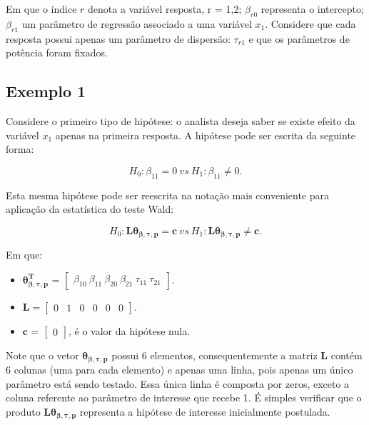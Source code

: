 \noindent Em que o índice $r$ denota a variável resposta, r = 1,2; $\beta_{r0}$ representa o intercepto; $\beta_{r1}$ um parâmetro de regressão associado a uma variável $x_1$. Considere que cada resposta possui apenas um parâmetro de dispersão: $\tau_{r1}$ e que os parâmetros de potência foram fixados.

\subsection{Exemplo 1}

Considere o primeiro tipo de hipótese: o analista deseja saber se existe efeito da variável $x_1$ apenas na primeira resposta. A hipótese pode ser escrita da seguinte forma:

\begin{equation}
H_0: \beta_{11} = 0 \ vs \ H_1: \beta_{11} \neq 0.
\end{equation}

Esta mesma hipótese pode ser reescrita na notação mais conveniente para aplicação da estatística do teste Wald:

\begin{equation}
H_0: \boldsymbol{L}\boldsymbol{\theta_{\beta,\tau,p}} = \boldsymbol{c} \ vs \ H_1: \boldsymbol{L}\boldsymbol{\theta_{\beta,\tau,p}} \neq \boldsymbol{c}.
\end{equation}

\noindent Em que:

\begin{itemize}
  
  \item $\boldsymbol{\theta_{\beta,\tau,p}^T}$ = $\begin{bmatrix} \beta_{10} \  \beta_{11} \ \beta_{20} \ \beta_{21} \ \tau_{11} \ \tau_{21} \end{bmatrix}$.


\item $\boldsymbol{L} = \begin{bmatrix} 0 & 1 & 0 & 0 & 0 & 0  \end{bmatrix}.$
 
\item $\boldsymbol{c}$ = $\begin{bmatrix} 0 \end{bmatrix}$, é o valor da hipótese nula. 

\end{itemize}

Note que o vetor $\boldsymbol{\theta_{\beta,\tau,p}}$ possui 6 elementos, consequentemente a matriz $\boldsymbol{L}$ contém 6 colunas (uma para cada elemento) e apenas uma linha, pois apenas um único parâmetro está sendo testado. Essa única linha é composta por zeros, exceto a coluna referente ao parâmetro de interesse que recebe 1. É simples verificar que o produto $\boldsymbol{L}\boldsymbol{\theta_{\beta,\tau,p}}$ representa a hipótese de interesse inicialmente postulada.

